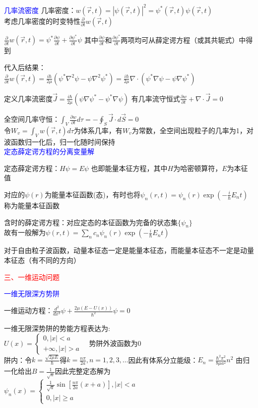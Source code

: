 \documentclass[a4paper,8pt]{extarticle} %
\newcommand{\bluetext}[1]{\textcolor{blue}{#1}}
\newcommand{\redtext}[1]{\textcolor{red}{#1}}
\begin{document}
\begin{multicols}{3}
\bluetext{几率流密度}
几率密度：$w(\vec{r}, t) = |\psi(\vec{r}, t)|^2 = \psi^*(\vec{r}, t)\psi(\vec{r}, t)$ \\ 考虑几率密度的时变特性$\frac{\partial}{\partial t}w(\vec{r}, t)$
    
    $\frac{\partial}{\partial t}w(\vec{r}, t) = \psi^*\frac{\partial\psi}{\partial t} + \frac{\partial\psi^*}{\partial t}\psi$ 其中$\frac{\partial\psi}{\partial t}$和$\frac{\partial\psi^*}{\partial t}$两项均可从薛定谔方程（或其共轭式）中得到
    
    代入后结果：\\ $\frac{\partial}{\partial t}w(\vec{r}, t) = \frac{i\hbar}{2\mu}(\psi^*\nabla^2\psi - \psi\nabla^2\psi^*) = \frac{i\hbar}{2\mu}\nabla\cdot(\psi^*\nabla\psi - \psi\nabla\psi^*)$
    
    定义几率流密度$\vec{J} = \frac{i\hbar}{2\mu}(\psi\nabla\psi^* - \psi^*\nabla\psi)$ 有几率流守恒式$\frac{\partial w}{\partial t} + \nabla\cdot\vec{J} = 0$

    全空间几率守恒：$\int_V \frac{\partial w}{\partial t}d\tau = - \oint_S \vec{J}\cdot d\vec{S} = 0$\\

    令$W_v=\int_V w(\vec{r}, t)d\tau$为体系几率，有$W_v$为常数，全空间出现粒子的几率为1，对波函数归一化后，归一化随时间保持\\
\bluetext{定态薛定谔方程的分离变量解}

定态薛定谔方程：$H\psi = E\psi$ 也即能量本征方程，其中$H$为哈密顿算符，$E$为本征值

对应的$\psi(r)$为能量本征函数(态)，有时也将$\psi_n(r, t) = \psi_n(r)\exp(-\frac{i}{\hbar}E_n t)$称为能量本征函数

含时的薛定谔方程：对应定态的本征函数为完备的状态集$\{\psi_n\}$\\
故有一般解为$\psi(r, t) = \sum_n c_n\psi_n(r)\exp(-\frac{i}{\hbar}E_n t)$

对于自由粒子波函数，动量本征态一定是能量本征态，而能量本征态不一定是动量本征态（有不同的方向）

\redtext{三、一维运动问题}

\bluetext{一维无限深方势阱}

一维运动方程：$\frac{d^2}{dx^2}\psi + \frac{2\mu(E-U(x))}{\hbar^2}\psi = 0$

一维无限深势阱的势能方程表达为: \\
$ U(x) = \begin{cases} 
0, |x| < a \\
+\infty, |x| > a
\end{cases} \quad \text{势阱外波函数为0} $\\
阱内：令$k = \frac{\sqrt{2\mu E}}{\hbar}$得$k = \frac{n\pi}{2a}, n=1,2,3,\dots$因此有体系分立能级：$E_n = \frac{\hbar^2\pi^2}{8\mu a^2}n^2$
由归一化给出$B = \frac{1}{\sqrt{a}}$因此完整定态解为 \\
$ \psi_n(x) = \begin{cases}
\frac{1}{\sqrt{a}}\sin[\frac{n\pi}{2a}(x + a)], |x| < a \\
0, |x| \geq a
\end{cases} $


\end{multicols}
\end{document}
